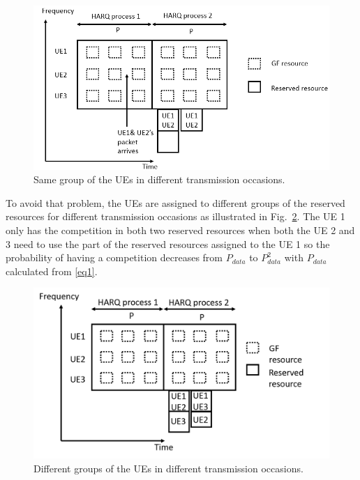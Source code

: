 \documentclass[conference]{IEEEtran}
\begin{document}
\begin{figure}[htbp]
\centerline{\includegraphics[scale=0.32]{fig5.png}}
\caption{Same group of the UEs in different transmission occasions.}
\label{fig5}
\end{figure}

To avoid that problem, the UEs are assigned to different groups of the reserved resources for different transmission occasions as illustrated in Fig.~\ref{fig6}. The UE 1 only has the competition in both two reserved resources when both the UE 2 and 3 need to use the part of the reserved resources assigned to the UE 1 so the probability of having a competition decreases from $P_{data}$ to $P_{data}^2$ with $P_{data}$ calculated from \eqref{eq1}.

\begin{figure}[htbp]
\centerline{\includegraphics[scale=0.32]{fig6.png}}
\caption{Different groups of the UEs in different transmission occasions.}
\label{fig6}
\end{figure}
\end{document}
